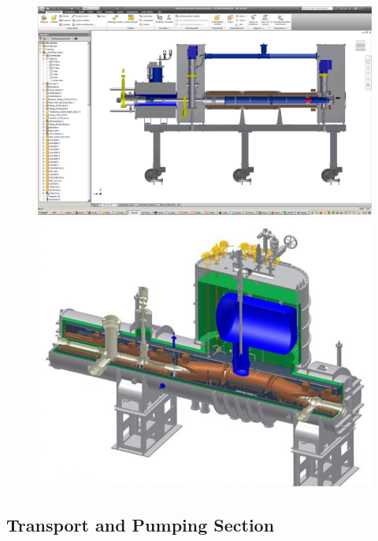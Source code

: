      \begin{figure}
		\begin{minipage}{0.49\textwidth}
				\includegraphics[width = 1.0\textwidth]{graphics/katrinExperiment/rearSection.png}
		\end{minipage}
		\begin{minipage}{0.49\textwidth}
			\includegraphics[width = 1.0\textwidth]{graphics/katrinExperiment/CPS.jpg}
		\end{minipage}
		\caption[DPS and CPS]{}
		\label{fig:sourceSide}
      \end{figure}
      
      
      \subsection{Transport and Pumping Section}
      

